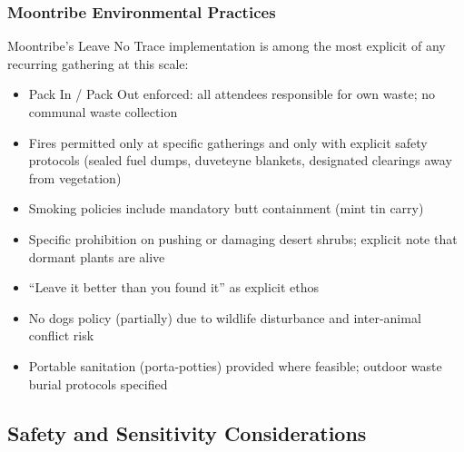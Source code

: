\documentclass[11pt,letterpaper]{article}
\begin{document}
\subsubsection{Moontribe Environmental Practices}

Moontribe's Leave No Trace implementation is among the most explicit of any recurring gathering at this scale:

\begin{itemize}[nosep]
  \item Pack In / Pack Out enforced: all attendees responsible for own waste; no communal waste collection
  \item Fires permitted only at specific gatherings and only with explicit safety protocols (sealed fuel dumps, duveteyne blankets, designated clearings away from vegetation)
  \item Smoking policies include mandatory butt containment (mint tin carry)
  \item Specific prohibition on pushing or damaging desert shrubs; explicit note that dormant plants are alive
  \item ``Leave it better than you found it'' as explicit ethos
  \item No dogs policy (partially) due to wildlife disturbance and inter-animal conflict risk
  \item Portable sanitation (porta-potties) provided where feasible; outdoor waste burial protocols specified
\end{itemize}

\subsection{Safety and Sensitivity Considerations}
\end{document}
